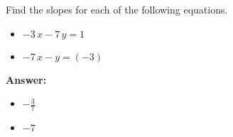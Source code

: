  Find the slopes for each of the following equations. \begin{itemize}\item \( -3 \, x - 7 \, y = 1 \)\item \( -7 \, x - y = \left(-3\right) \)\end{itemize}

        \textbf{Answer:} \begin{itemize}\item \( -\frac{3}{7} \)\item \( -7 \)\end{itemize}
